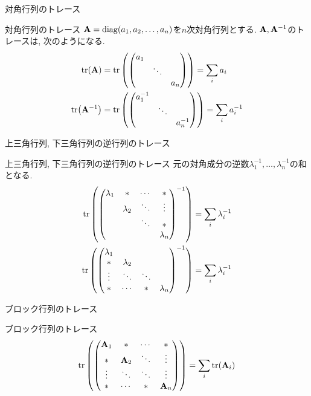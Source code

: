 \documentclass[dvipdfmx,notheorems,t]{beamer}
\begin{document}
\begin{frame}{対角行列のトレース}
\begin{block}{対角行列のトレース}
  $\vb{A} = \operatorname{diag}(a_1, a_2, \ldots, a_n)$を$n$次対角行列とする.
  $\vb{A}, \vb{A}^{-1}$のトレースは, 次のようになる.
  \begin{align*}
    \tr(\vb{A}) &= \tr\left( \mqty(\dmat{a_1, \ddots, a_n}) \right) = \sum_i a_i \\
    \tr(\vb{A}^{-1}) &= \tr\left( \mqty(\dmat{a_1^{-1}, \ddots, a_n^{-1}}) \right) = \sum_i a_i^{-1}
  \end{align*}
\end{block}
\end{frame}

\begin{frame}{上三角行列, 下三角行列の逆行列のトレース}
\begin{block}{上三角行列, 下三角行列の逆行列のトレース}
  元の対角成分の逆数$\lambda_1^{-1}, \ldots, \lambda_n^{-1}$の和となる.
  \begin{align*}
    \tr\left( \mqty(\lambda_1 & * & \cdots & * \\
      & \lambda_2 & \ddots & \vdots \\
      & & \ddots & * \\
      & & & \lambda_n)^{-1} \right) &= \sum_i \lambda_i^{-1} \\
    \tr\left( \mqty(\lambda_1 \\ * & \lambda_2 \\
      \vdots & \ddots & \ddots \\
      * & \cdots & * & \lambda_n)^{-1} \right) &= \sum_i \lambda_i^{-1}
  \end{align*}
\end{block}
\end{frame}

\begin{frame}{ブロック行列のトレース}
\begin{block}{ブロック行列のトレース}
  $$\tr\left( \mqty(\vb{A}_1 & * & \cdots & * \\
    * & \vb{A}_2 & \ddots & \vdots \\
    \vdots & \ddots & \ddots & \vdots \\
    * & \cdots & * & \vb{A}_n) \right) = \sum_i \tr(\vb{A}_i)$$
\end{block}
\end{frame}
\end{document}
